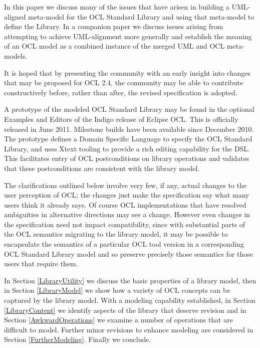 \documentclass{eceasst}
\begin{document}
In this paper we discuss many of the issues that have arisen in building a UML-aligned meta-model for the OCL Standard Library and using that meta-model to define the Library. In a companion paper\cite{OCL-UML} we discuss issues arising from attempting to achieve UML-alignment more generally and establish the meaning of an OCL model as a combined instance of the merged UML and OCL meta-models.

It is hoped that by presenting the community with an early insight into changes that may be proposed for OCL 2.4, the community may be able to contribute constructively before, rather than after, the revised specification is adopted.

A prototype of the modeled OCL Standard Library may be found in the optional Examples and Editors of the Indigo release of Eclipse OCL\cite{MDT/OCL}. This is officially released in June 2011. Milestone builds have been available since December 2010. The prototype defines a Domain Specific Language to specify the OCL Standard Library, and uses Xtext\cite{TMF/Xtext} tooling to provide a rich editing capability for the DSL. This facilitates entry of OCL postconditions on library operations and validates that these postconditions are consistent with the library model.

The clarifications outlined below involve very few, if any, actual changes to the user perception of OCL; the changes just make the specification say what many users think it already says. Of course OCL implementations that have resolved ambiguities in alternative directions may see a change. However even changes in the specification need not impact compatibility, since with substantial parts of the OCL semantics migrating to the library model, it may be possible to encapsulate the semantics of a particular OCL tool version in a corresponding OCL Standard Library model and so preserve precisely those semantics for those users that require them.

In Section \ref{LibraryUtility} we discuss the basic properties of a library model, then in Section \ref{LibraryModel} we show how a variety of OCL concepts can be captured by the library model. With a modeling capability established, in Section \ref{LibraryContent} we identify aspects of the library that deserve revision and in Section \ref{AwkwardOperations} we examine a number of operations that are difficult to model. Further minor revisions to enhance modeling are considered in Section \ref{FurtherModeling}. Finally we conclude. 
\end{document}

